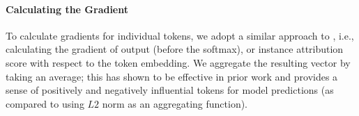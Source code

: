 

\paragraph{Calculating the Gradient} To calculate gradients for individual tokens, we adopt a similar approach to \citet{atanasova2020diagnostic}, i.e., calculating the gradient of output (before the softmax), or instance attribution score with respect to the token embedding. 
We aggregate the resulting vector by taking an average; this has shown to be effective in prior work \citet{atanasova2020diagnostic} and provides a sense of positively and negatively influential tokens for model predictions (as compared to using $L2$ norm as an aggregating function).   




